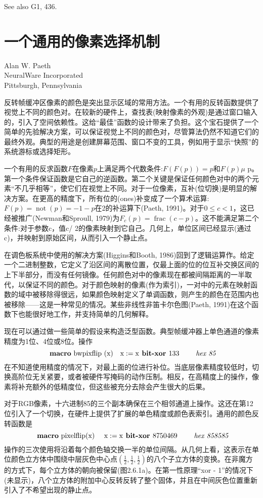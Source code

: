 \begin{CJK}{UTF8}{gbsn}
See also G1, 436.

\newpage
\section{一个通用的像素选择机制}
\begin{center}
\small{
Alan W. Paeth\\
NeuralWare Incorporated\\
Pittsburgh, Pennsylvania}
\end{center}

反转帧缓冲区像素的颜色是突出显示区域的常用方法。一个有用的反转函数提供了视觉上不同的颜色对。在较新的硬件上，查找表(映射像素的外观)是通过窗口输入的，引入了空间依赖性。这给“最佳”函数的设计带来了负担。这个宝石提供了一个简单的先验解决方案，可以保证视觉上不同的颜色对，尽管算法仍然不知道它们的最终外观。典型的用途是创建屏幕范围、窗口不变的工具，例如用于显示“快照”的系统游标或选择矩形。

一个有用的反求函数$F$在像素$p$上满足两个代数条件:$F(F(p))=p$和$F(p) \mu$ p。第一个条件保证函数是它自己的逆函数。第二个关键是保证任何颜色对中的两个元素“不几乎相等”，使它们在视觉上不同。对于一位像素，互补(位切换)是明显的解决方案。在更高的精度下，所有位的(ones)补变成了一个算术运算:$F(p)=\operatorname{not}(p)=-1-p$在2的补运算下(Paeth, 1991)。对于$0 \leq c<1$，这已经被推广(Newman和Sproull, 1979)为$F_{c}(p)=\operatorname{frac}(c-p)$。这不能满足第二个条件:对于参数c，值c/ 2的像素映射到它自己。几何上，单位区间已经显示(通过c)，并映射到原始区间，从而引入一个静止点。

在调色板系统中使用的解决方案(Higgins和Booth, 1986)回到了逻辑运算作。给定一个二进制整数，它定义了沿区间的离散位置，仅最上面的位的位互补交换区间的上下半部分，而没有任何镜像。任何颜色对中的像素现在都被间隔距离的一半取代，以保证不同的颜色。对于颜色映射的像素(作为索引)，一对中的元素在映射函数的域中被移除得很远，如果颜色映射定义了单调函数，则产生的颜色在范围内也被移除——这是一种常见的情况。某些非线性非笛卡尔色图(Paeth, 1991)在这个函数下也能很好地工作，并支持简单的几何解释。

现在可以通过做一些简单的假设来构造泛型函数。典型帧缓冲器上单色通道的像素精度为1位、4位或8位。操作
$$
\text { \textbf{macro} bwpixflip }(\mathrm{x}) \quad \mathrm{x}:=\mathrm{x} \textbf{ bit-xor } 133 \qquad \textit { hex  85}
$$
在不知道使用精度的情况下，对最上面的位进行补位。当底层像素精度较低时，切换高阶位无关紧要，或者被硬件写掩码的动作压制。相反，在高精度上的操作，像素将补充额外的低精度位，但这些被充分去除会产生很大的后果。

对于RGB像素，十六进制85的三个副本确保在三个相邻通道上操作。这还在第12位引入了一个切换，在硬件上提供了扩展的单色精度或颜色表索引。通用的颜色反转函数是
$$
\text { \textbf{macro} pixelflip(x) } \quad \mathrm{x}:=\mathrm{x} \textbf { bit-xor } 8750469 \qquad\textit { hex  858585}
$$
操作的三次使用将沿着每个颜色轴交换一半的单位间隔。从几何上看，这表示在单位颜色立方体中围绕中层灰色中心点$\left(\frac{1}{2},\frac{1}{2},\frac{1}{2}\right)$的八个子立方体的变换。在非魔方的方式下，每个立方体的朝向被保留(图2.6.1a)。在第一性原理“xor - 1”的情况下(未显示)，八个立方体的附加中心反转反转了整个固体，并且在中间灰色位置重新引入了不希望出现的静止点。


\end{CJK}
